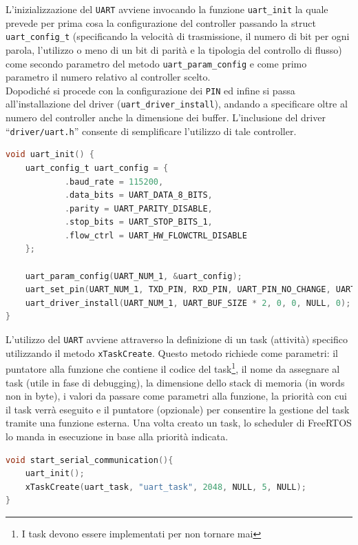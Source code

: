 \noindent L'inizializzazione del \texttt{UART} avviene invocando la funzione \texttt{uart\_init} la quale prevede per prima cosa la configurazione del controller passando la struct \texttt{uart\_config\_t} (specificando la velocità di trasmissione, il numero di bit per ogni parola, l'utilizzo o meno di un bit di parità e la tipologia del controllo di flusso) come secondo parametro del metodo \texttt{uart\_param\_config} e come primo parametro il numero relativo al controller scelto. \\
Dopodiché si procede con la configurazione dei \texttt{PIN} ed infine si passa all'installazione del driver (\texttt{uart\_driver\_install}), andando a specificare oltre al numero del controller anche la dimensione dei buffer. L'inclusione del driver ``\texttt{driver/uart.h}'' consente di semplificare l'utilizzo di tale controller.

\begin{lstlisting}[language=C, caption= Configurazione e installazione driver \texttt{UART}]
void uart_init() {
    uart_config_t uart_config = {
            .baud_rate = 115200,
            .data_bits = UART_DATA_8_BITS,
            .parity = UART_PARITY_DISABLE,
            .stop_bits = UART_STOP_BITS_1,
            .flow_ctrl = UART_HW_FLOWCTRL_DISABLE
    };

    uart_param_config(UART_NUM_1, &uart_config);
    uart_set_pin(UART_NUM_1, TXD_PIN, RXD_PIN, UART_PIN_NO_CHANGE, UART_PIN_NO_CHANGE);
    uart_driver_install(UART_NUM_1, UART_BUF_SIZE * 2, 0, 0, NULL, 0);
}
\end{lstlisting}

\noindent L'utilizzo del \texttt{UART} avviene attraverso la definizione di un task (attività) specifico utilizzando il metodo \texttt{xTaskCreate}. Questo metodo richiede come parametri: il puntatore alla funzione che contiene il codice del task\footnote{I task devono essere implementati per non tornare mai}, il nome da assegnare al task (utile in fase di debugging), la dimensione dello stack di memoria (in words non in byte), i valori da passare come parametri alla funzione, la priorità con cui il task verrà eseguito e il puntatore (opzionale) per consentire la gestione del task tramite una funzione esterna. Una volta creato un task, lo scheduler di FreeRTOS lo manda in esecuzione in base alla priorità indicata.

\begin{lstlisting}[language=C, caption= Inizializzazione e definizione del task per utilizzare il \texttt{UART}]
void start_serial_communication(){
    uart_init();
    xTaskCreate(uart_task, "uart_task", 2048, NULL, 5, NULL);
}
\end{lstlisting}

